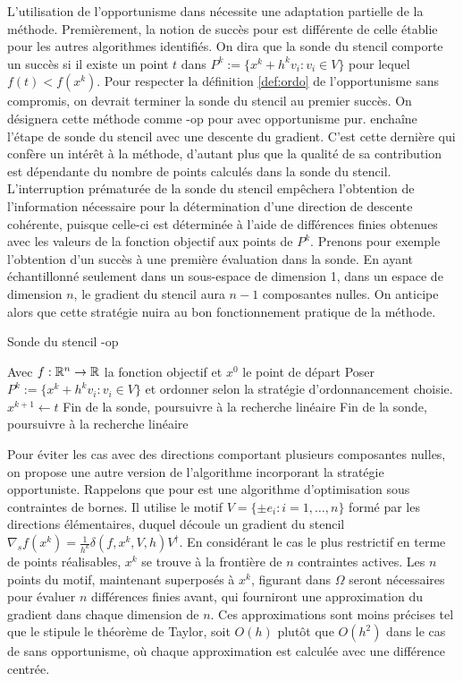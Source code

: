 L'utilisation de l'opportunisme dans \imfil nécessite une adaptation partielle de la méthode. Premièrement, la notion de succès pour \imfil est différente de celle établie pour les autres algorithmes identifiés. On dira que la sonde du stencil comporte un succès si il existe un point $t$ dans $P^k := \{x^k+h^kv_i: v_i \in V\}$ pour lequel $f(t)<f(x^k)$. Pour respecter la définition \ref{def:ordo} de l'opportunisme sans compromis, on devrait terminer la sonde du stencil au premier succès. On désignera cette méthode comme \textsf{\imfil-op} pour \imfil avec opportunisme pur. \imfil enchaîne l'étape de sonde du stencil avec une descente du gradient. C'est cette dernière qui confère un intérêt à la méthode, d'autant plus que la qualité de sa contribution est dépendante du nombre de points calculés dans la sonde du stencil. L'interruption prématurée de la sonde du stencil empêchera l'obtention de l'information nécessaire pour la détermination d'une direction de descente cohérente, puisque celle-ci est déterminée à l'aide de différences finies obtenues avec les valeurs de la fonction objectif aux points de $P^k$. Prenons pour exemple l'obtention d'un succès à une première évaluation dans la sonde. En ayant échantillonné seulement dans un sous-espace de dimension 1, dans un espace de dimension $n$, le gradient du stencil aura $n-1$ composantes nulles. On anticipe alors que cette stratégie nuira au bon fonctionnement pratique de la méthode.
\begin{algorithm}[H]
 	\caption{\textsf{Sonde du stencil \imfil-op}}
 	\label{alg:imfilop}
 	\begin{algorithmic}
 		\STATE Avec $f:\mathbb{R}^n \rightarrow \mathbb{R}$ la fonction objectif et $x^0$ le point de départ
 		\STATE Poser $P^k := \{x^k+h^kv_i: v_i \in V\}$ et ordonner selon la stratégie d'ordonnancement choisie.
 		\STATE $x^{k+1} \leftarrow t$
 		\STATE Fin de la sonde, poursuivre à la recherche linéaire
 		\ENDIF
 		\ENDFOR
 		\STATE Fin de la sonde, poursuivre à la recherche linéaire
 	 	\end{algorithmic}
\end{algorithm}
Pour éviter les cas avec des directions comportant plusieurs composantes nulles, on propose une autre version de l'algorithme incorporant la stratégie opportuniste. Rappelons que pour \imfil est une algorithme d'optimisation sous contraintes de bornes. Il utilise le motif $V = \{\pm e_i : i=1,\dots,n\}$ formé par les directions élémentaires, duquel découle un gradient du stencil $\nabla_{s}f(x^k) = \frac{1}{h^k}\delta(f,x^k,V,h)V^{\dagger}$. En considérant le cas le plus restrictif en terme de points réalisables, $x^k$ se trouve à la frontière de $n$ contraintes actives. Les $n$ points du motif, maintenant superposés à $x^k$, figurant dans $\Omega$ seront nécessaires pour évaluer $n$ différences finies avant, qui fourniront une approximation du gradient dans chaque dimension de $n$. Ces approximations sont moins précises tel que le stipule le théorème de Taylor, soit $O(h)$ plutôt que $O(h^2)$ dans le cas de \imfil sans opportunisme, où chaque approximation est calculée avec une différence centrée.   
  
